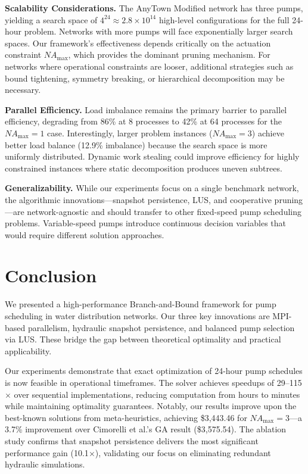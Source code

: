 \documentclass[a4paper,fleqn]{cas-dc}
\begin{document}
\textbf{Scalability Considerations.} The AnyTown Modified network has three pumps, yielding a search space of $4^{24} \approx 2.8 \times 10^{14}$ high-level configurations for the full 24-hour problem. Networks with more pumps will face exponentially larger search spaces. Our framework's effectiveness depends critically on the actuation constraint $NA_{\max}$, which provides the dominant pruning mechanism. For networks where operational constraints are looser, additional strategies such as bound tightening, symmetry breaking, or hierarchical decomposition may be necessary.

\textbf{Parallel Efficiency.} Load imbalance remains the primary barrier to parallel efficiency, degrading from 86\% at 8 processes to 42\% at 64 processes for the $NA_{\max}=1$ case. Interestingly, larger problem instances ($NA_{\max}=3$) achieve better load balance (12.9\% imbalance) because the search space is more uniformly distributed. Dynamic work stealing could improve efficiency for highly constrained instances where static decomposition produces uneven subtrees.

\textbf{Generalizability.} While our experiments focus on a single benchmark network, the algorithmic innovations---snapshot persistence, LUS, and cooperative pruning---are network-agnostic and should transfer to other fixed-speed pump scheduling problems. Variable-speed pumps introduce continuous decision variables that would require different solution approaches.

\section{Conclusion}

We presented a high-performance Branch-and-Bound framework for pump scheduling in water distribution networks. Our three key innovations are MPI-based parallelism, hydraulic snapshot persistence, and balanced pump selection via LUS. These bridge the gap between theoretical optimality and practical applicability.

Our experiments demonstrate that exact optimization of 24-hour pump schedules is now feasible in operational timeframes. The solver achieves speedups of 29--115$\times$ over sequential implementations, reducing computation from hours to minutes while maintaining optimality guarantees. Notably, our results improve upon the best-known solutions from meta-heuristics, achieving \$3,443.46 for $NA_{\max}=3$---a 3.7\% improvement over Cimorelli et al.'s GA result (\$3,575.54). The ablation study confirms that snapshot persistence delivers the most significant performance gain (10.1$\times$), validating our focus on eliminating redundant hydraulic simulations.
\end{document}

